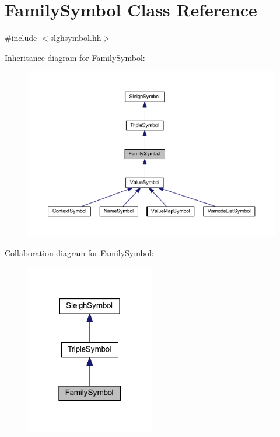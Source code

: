 \hypertarget{class_family_symbol}{}\section{Family\+Symbol Class Reference}
\label{class_family_symbol}


{\ttfamily \#include $<$slghsymbol.\+hh$>$}



Inheritance diagram for Family\+Symbol\+:
\nopagebreak
\begin{figure}[H]
\begin{center}
\leavevmode
\includegraphics[width=350pt]{class_family_symbol__inherit__graph}
\end{center}
\end{figure}


Collaboration diagram for Family\+Symbol\+:
\nopagebreak
\begin{figure}[H]
\begin{center}
\leavevmode
\includegraphics[width=159pt]{class_family_symbol__coll__graph}
\end{center}
\end{figure}
